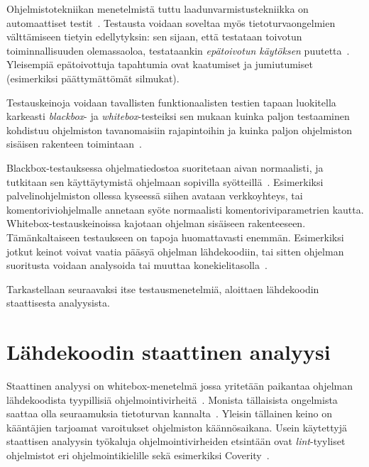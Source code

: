 Ohjelmistotekniikan menetelmistä tuttu laadunvarmistustekniikka on automaattiset testit~\cite[23.1]{Sommerville}.
Testausta voidaan soveltaa myös tietoturvaongelmien välttämiseen tietyin edellytyksin:
sen sijaan, että testataan toivotun toiminnallisuuden olemassaoloa,
testataankin \emph{epätoivotun käytöksen} puutetta~\cite{OuluBrowser}.
Yleisempiä epätoivottuja tapahtumia ovat kaatumiset ja jumiutumiset (esimerkiksi päättymättömät silmukat).


Testauskeinoja voidaan tavallisten funktionaalisten testien tapaan luokitella karkeasti
\emph{blackbox}- ja \emph{whitebox}-testeiksi sen mukaan kuinka paljon
testaaminen kohdistuu ohjelmiston tavanomaisiin rajapintoihin ja kuinka paljon
ohjelmiston sisäisen rakenteen toimintaan~\cite{OuluBrowser}.

Blackbox-testauksessa ohjelmatiedostoa suoritetaan aivan normaalisti,
ja tutkitaan sen käyttäytymistä ohjelmaan sopivilla syötteillä~\cite{OuluBrowser}.
Esimerkiksi palvelinohjelmiston ollessa kyseessä siihen avataan verkkoyhteys,
tai komentoriviohjelmalle annetaan syöte normaalisti komentoriviparametrien kautta.
Whitebox-testauskeinoissa kajotaan ohjelman sisäiseen rakenteeseen.
Tä\-män\-kal\-tai\-seen testaukseen on tapoja huomattavasti enemmän.
Esimerkiksi jotkut keinot voivat vaatia pääsyä ohjelman lähdekoodiin,
tai sitten ohjelman suoritusta voidaan analysoida tai muuttaa konekielitasolla~\cite{OuluBrowser}.

Tarkastellaan seuraavaksi itse testausmenetelmiä,
aloittaen lähdekoodin staattisesta analyysista.

\section{Lähdekoodin staattinen analyysi}
\label{StaattinenAnalyysi}

Staattinen analyysi on whitebox-menetelmä jossa yritetään paikantaa ohjelman
lähdekoodista tyypillisiä ohjelmointivirheitä~\cite[22.3]{Sommerville}.
Monista täl\-lai\-sis\-ta ongelmista saattaa olla seuraamuksia tietoturvan kannalta~\cite{StaticCodeAnalysis}.
Yleisin tällainen keino on kääntäjien tarjoamat varoitukset ohjelmiston käännösaikana.
Usein käytettyjä staattisen analyysin työkaluja ohjelmointivirheiden etsintään
ovat \emph{lint}-tyyliset~\cite{Lint} ohjelmistot eri ohjelmointikielille sekä
esimerkiksi Coverity~\cite{Coverity}.

